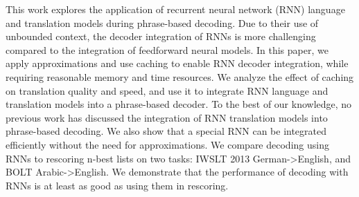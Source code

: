 This work explores the application of recurrent neural network (RNN) language and translation models during phrase-based decoding. Due to their use of unbounded context, the decoder integration of RNNs is more challenging compared to the integration of feedforward neural models. In this paper, we apply approximations and use caching to enable RNN decoder integration, while requiring reasonable memory and time resources. We analyze the effect of caching on translation quality and speed, and use it to integrate RNN language and translation models into a phrase-based decoder. To the best of our knowledge, no previous work has discussed the integration of RNN translation models into phrase-based decoding. We also show that a special RNN can be integrated efficiently without the need for approximations.  We compare decoding using RNNs to rescoring n-best lists on two tasks: IWSLT 2013 German->English, and  BOLT Arabic->English. We demonstrate that the performance of decoding with RNNs is at least as good as using them in rescoring.

